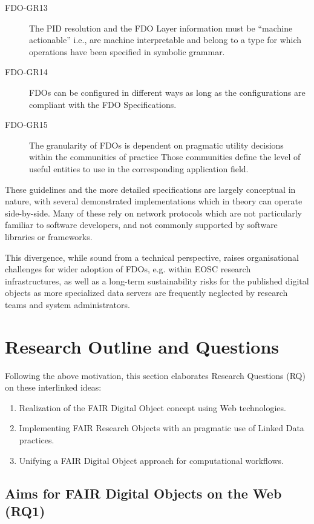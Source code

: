 \begin{description}
\item[FDO-GR13] The PID resolution and the FDO Layer information must be “machine actionable” i.e., are machine interpretable and belong to a type for which operations have been specified in symbolic grammar. 
\item[FDO-GR14] FDOs can be configured in different ways as long as the configurations are compliant with the FDO Specifications. 
\item[FDO-GR15] The granularity of FDOs is dependent on pragmatic utility decisions within the communities of practice Those communities define the level of useful entities to use in the corresponding application field.
\end{description}

These guidelines and the more detailed specifications \cite{Ivonne 2023} are largely conceptual in nature, with several demonstrated implementations \cite{Wittenburg 2022a,Lannom 2022a} which in theory can operate side-by-side. Many of these rely on network protocols \cite{Reilly 2009,Sun 2003a} which are not particularly familiar to software developers, and not commonly supported by software libraries or frameworks.

This divergence, while sound from a technical perspective, raises organisational challenges for wider adoption of FDOs, e.g. within EOSC research infrastructures, as well as a long-term sustainability risks for the published digital objects as more specialized data servers are frequently neglected by research teams and system administrators. %


\section{Research Outline and Questions}
\label{intro:outline}

Following the above motivation, this section elaborates Research Questions (RQ) on these interlinked ideas:

\begin{enumerate}
    \item Realization of the FAIR Digital Object concept using Web technologies.
    \item Implementing FAIR Research Objects with an pragmatic use of Linked Data practices.
    \item Unifying a FAIR Digital Object approach for computational workflows.
\end{enumerate}

\subsection{Aims for FAIR Digital Objects on the Web (RQ1)}
\label{intro:rq1}

